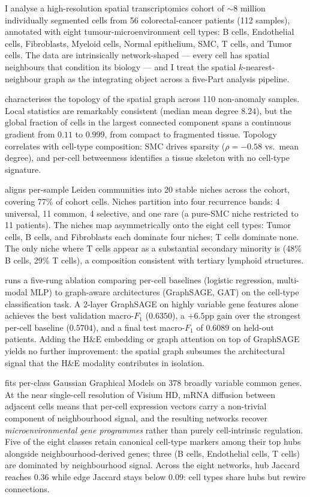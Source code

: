 I analyse a high-resolution spatial transcriptomics cohort of $\sim 8$ million individually segmented cells from 56 colorectal-cancer patients (112 samples), annotated with eight tumour-microenvironment cell types: B cells, Endothelial cells, Fibroblasts, Myeloid cells, Normal epithelium, SMC, T cells, and Tumor cells. The data are intrinsically network-shaped --- every cell has spatial neighbours that condition its biology --- and I treat the spatial $k$-nearest-neighbour graph as the integrating object across a five-Part analysis pipeline.

 characterises the topology of the spatial graph across 110 non-anomaly samples. Local statistics are remarkably consistent (median mean degree $8.24$), but the global fraction of cells in the largest connected component spans a continuous gradient from $0.11$ to $0.999$, from compact to fragmented tissue. Topology correlates with cell-type composition: SMC drives sparsity ($\rho = -0.58$ vs.\ mean degree), and per-cell betweenness identifies a tissue skeleton with no cell-type signature.

 aligns per-sample Leiden communities into 20 stable niches across the cohort, covering 77\% of cohort cells. Niches partition into four recurrence bands: 4 universal, 11 common, 4 selective, and one rare (a pure-SMC niche restricted to 11 patients). The niches map asymmetrically onto the eight cell types: Tumor cells, B cells, and Fibroblasts each dominate four niches; T cells dominate none. The only niche where T cells appear as a substantial secondary minority is  (48\% B cells, 29\% T cells), a composition consistent with tertiary lymphoid structures.

 runs a five-rung ablation comparing per-cell baselines (logistic regression, multi-modal MLP) to graph-aware architectures (GraphSAGE, GAT) on the cell-type classification task. A 2-layer GraphSAGE on highly variable gene features alone achieves the best validation macro-$F_1$ ($0.6350$), a $+6.5$pp gain over the strongest per-cell baseline ($0.5704$), and a final test macro-$F_1$ of $0.6089$ on held-out patients. Adding the H\&E embedding or graph attention on top of GraphSAGE yields no further improvement: the spatial graph subsumes the architectural signal that the H\&E modality contributes in isolation.

 fits per-class Gaussian Graphical Models on 378 broadly variable common genes. At the near single-cell resolution of Visium HD, mRNA diffusion between adjacent cells means that per-cell expression vectors carry a non-trivial component of neighbourhood signal, and the resulting networks recover \emph{microenvironmental gene programmes} rather than purely cell-intrinsic regulation. Five of the eight classes retain canonical cell-type markers among their top hubs alongside neighbourhood-derived genes; three (B cells, Endothelial cells, T cells) are dominated by neighbourhood signal. Across the eight networks, hub Jaccard reaches $0.36$ while edge Jaccard stays below $0.09$: cell types share hubs but rewire connections.

